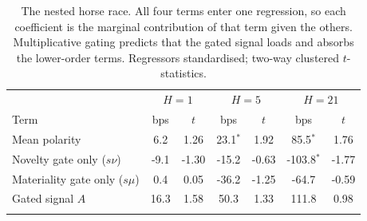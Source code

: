 \begin{table}[htbp]
\caption{The nested horse race. All four terms enter one regression, so each
coefficient is the marginal contribution of that term given the others.
Multiplicative gating predicts that the gated signal loads and absorbs the
lower-order terms. Regressors standardised; two-way clustered $t$-statistics.}
\label{tab:horserace}
\begin{tabular}{@{}lcccccc@{}}
\toprule
 & \multicolumn{2}{c}{$H=1$} & \multicolumn{2}{c}{$H=5$} & \multicolumn{2}{c}{$H=21$} \\
Term & bps & $t$ & bps & $t$ & bps & $t$ \\
\midrule
Mean polarity & 6.2 & 1.26 & 23.1$^{*}$ & 1.92 & 85.5$^{*}$ & 1.76 \\
Novelty gate only ($s\nu$) & -9.1 & -1.30 & -15.2 & -0.63 & -103.8$^{*}$ & -1.77 \\
Materiality gate only ($s\mu$) & 0.4 & 0.05 & -36.2 & -1.25 & -64.7 & -0.59 \\
Gated signal $A$ & 16.3 & 1.58 & 50.3 & 1.33 & 111.8 & 0.98 \\
\botrule
\end{tabular}
\end{table}
